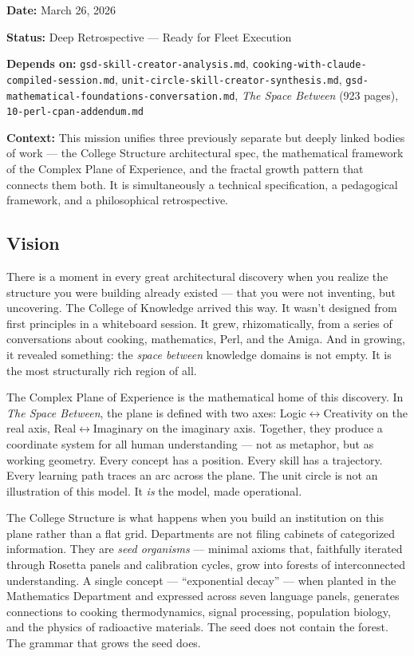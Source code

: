 \documentclass[11pt,letterpaper]{article}
\newcommand{\metafield}[2]{\textbf{\sffamily #1} #2\par}
\begin{document}
\metafield{Date:}{March 26, 2026}
\metafield{Status:}{Deep Retrospective --- Ready for Fleet Execution}
\metafield{Depends on:}{\texttt{gsd-skill-creator-analysis.md}, \texttt{cooking-with-claude-compiled-session.md},
\texttt{unit-circle-skill-creator-synthesis.md}, \texttt{gsd-mathematical-foundations-conversation.md},
\textit{The Space Between} (923 pages), \texttt{10-perl-cpan-addendum.md}}
\metafield{Context:}{This mission unifies three previously separate but deeply linked bodies of work ---
the College Structure architectural spec, the mathematical framework of the Complex Plane of Experience,
and the fractal growth pattern that connects them both. It is simultaneously a technical specification,
a pedagogical framework, and a philosophical retrospective.}

\subsection{Vision}

There is a moment in every great architectural discovery when you realize the structure you were
building already existed --- that you were not inventing, but uncovering. The College of Knowledge
arrived this way. It wasn't designed from first principles in a whiteboard session. It grew,
rhizomatically, from a series of conversations about cooking, mathematics, Perl, and the Amiga.
And in growing, it revealed something: the \textit{space between} knowledge domains is not empty.
It is the most structurally rich region of all.

The Complex Plane of Experience is the mathematical home of this discovery. In \textit{The Space
Between}, the plane is defined with two axes: Logic$\leftrightarrow$Creativity on the real axis,
Real$\leftrightarrow$Imaginary on the imaginary axis. Together, they produce a coordinate system
for all human understanding --- not as metaphor, but as working geometry. Every concept has a
position. Every skill has a trajectory. Every learning path traces an arc across the plane. The
unit circle is not an illustration of this model. It \textit{is} the model, made operational.

The College Structure is what happens when you build an institution on this plane rather than a
flat grid. Departments are not filing cabinets of categorized information. They are \textit{seed
organisms} --- minimal axioms that, faithfully iterated through Rosetta panels and calibration
cycles, grow into forests of interconnected understanding. A single concept --- ``exponential decay''
--- when planted in the Mathematics Department and expressed across seven language panels, generates
connections to cooking thermodynamics, signal processing, population biology, and the physics of
radioactive materials. The seed does not contain the forest. The grammar that grows the seed does.
\end{document}
